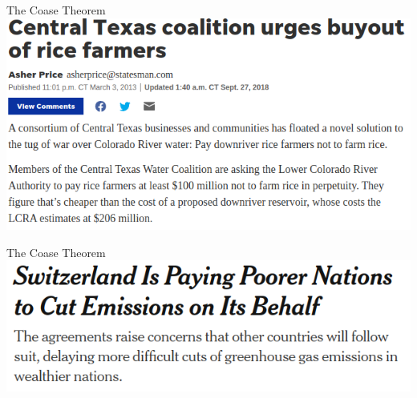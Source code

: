 \documentclass{beamer}
\begin{document}
\begin{frame}{The Coase Theorem}
\includegraphics[width = \textwidth]{images/coaseriver.png}
\end{frame}

\begin{frame}{The Coase Theorem}
\centering
\includegraphics[width = \textwidth]{images/coaseemissions.png}
\end{frame}
\end{document}

